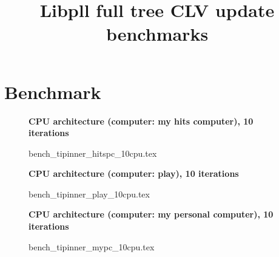 \documentclass[a4paper]{article}
\begin{document}
\newcommand*{\figuretitle}[1]{%
    {\centering%
    \textbf{#1}%
    \par\medskip}%
}


\title{Libpll full tree CLV update benchmarks}
\maketitle



\section{Benchmark}


\begin{figure}[!htb]
\figuretitle{CPU architecture (computer: my hits computer), 10 iterations}
{bench_tipinner_hitspc_10cpu.tex}
\end{figure}

\begin{figure}[!htb]
\figuretitle{CPU architecture (computer: play), 10 iterations}
{bench_tipinner_play_10cpu.tex}
\end{figure}


\begin{figure}[!htb]
\figuretitle{CPU architecture (computer: my personal computer), 10 iterations}
{bench_tipinner_mypc_10cpu.tex}
\end{figure}
\end{document}
